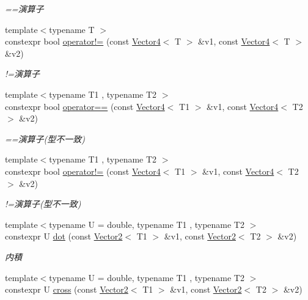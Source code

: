 \begin{DoxyCompactItemize}
\begin{DoxyCompactList}\small\item\em ==演算子 \end{DoxyCompactList}\item 
{\footnotesize template$<$typename T $>$ }\\constexpr bool \mbox{\hyperlink{namespacesaki_a0d4a71a1a84ddfe22acf3ffd305f1449}{operator!=}} (const \mbox{\hyperlink{classsaki_1_1_vector4}{Vector4}}$<$ T $>$ \&v1, const \mbox{\hyperlink{classsaki_1_1_vector4}{Vector4}}$<$ T $>$ \&v2)
\begin{DoxyCompactList}\small\item\em !=演算子 \end{DoxyCompactList}\item 
{\footnotesize template$<$typename T1 , typename T2 $>$ }\\constexpr bool \mbox{\hyperlink{namespacesaki_a3c0f3a38ce313956032cd123f702b7a5}{operator==}} (const \mbox{\hyperlink{classsaki_1_1_vector4}{Vector4}}$<$ T1 $>$ \&v1, const \mbox{\hyperlink{classsaki_1_1_vector4}{Vector4}}$<$ T2 $>$ \&v2)
\begin{DoxyCompactList}\small\item\em ==演算子(型不一致) \end{DoxyCompactList}\item 
{\footnotesize template$<$typename T1 , typename T2 $>$ }\\constexpr bool \mbox{\hyperlink{namespacesaki_a94fb7c22e19169a09ed778d18bf958e8}{operator!=}} (const \mbox{\hyperlink{classsaki_1_1_vector4}{Vector4}}$<$ T1 $>$ \&v1, const \mbox{\hyperlink{classsaki_1_1_vector4}{Vector4}}$<$ T2 $>$ \&v2)
\begin{DoxyCompactList}\small\item\em !=演算子(型不一致) \end{DoxyCompactList}\item 
{\footnotesize template$<$typename U  = double, typename T1 , typename T2 $>$ }\\constexpr U \mbox{\hyperlink{namespacesaki_a724d6c36d761314950d3ec8be6a4f4ab}{dot}} (const \mbox{\hyperlink{classsaki_1_1_vector2}{Vector2}}$<$ T1 $>$ \&v1, const \mbox{\hyperlink{classsaki_1_1_vector2}{Vector2}}$<$ T2 $>$ \&v2)
\begin{DoxyCompactList}\small\item\em 内積 \end{DoxyCompactList}\item 
{\footnotesize template$<$typename U  = double, typename T1 , typename T2 $>$ }\\constexpr U \mbox{\hyperlink{namespacesaki_ab3e7c6abdd4377486e393407283a492b}{cross}} (const \mbox{\hyperlink{classsaki_1_1_vector2}{Vector2}}$<$ T1 $>$ \&v1, const \mbox{\hyperlink{classsaki_1_1_vector2}{Vector2}}$<$ T2 $>$ \&v2)

\end{DoxyCompactItemize}
